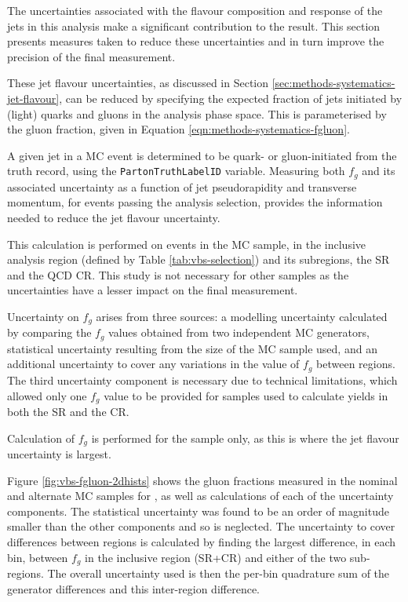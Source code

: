 \newcommand\fgluon{$f_g$\xspace}

The uncertainties associated with the flavour composition and response of the
jets in this analysis make a significant contribution to the result. This
section presents measures taken to reduce these uncertainties and in turn
improve the precision of the final measurement.

These jet flavour uncertainties, as discussed in Section
\ref{sec:methods-systematics-jet-flavour}, can be reduced by specifying the
expected fraction of jets initiated by (light) quarks and gluons in the analysis phase
space. This is parameterised by the gluon fraction, given in Equation
\ref{eqn:methods-systematics-fgluon}.

A given jet in a \ac{MC} event is determined to be quark- or gluon-initiated
from the truth record, using the \verb|PartonTruthLabelID| variable.  Measuring
both \fgluon and its associated uncertainty as a function of jet pseudorapidity
and transverse momentum, for events passing the analysis selection, provides the
information needed to reduce the jet flavour uncertainty.

This calculation is performed on events in the \QCDZy \ac{MC} sample, in
the inclusive analysis region (defined by Table \ref{tab:vbs-selection}) and its
subregions, the \ac{SR} and the \ac{QCD} \ac{CR}. This study is not necessary
for other samples as the uncertainties have a lesser impact on the final
measurement.

Uncertainty on \fgluon arises from three sources: a modelling uncertainty
calculated by comparing the \fgluon values obtained from two independent \ac{MC}
generators, statistical uncertainty resulting from the size of the \ac{MC}
sample used, and an additional uncertainty to cover any variations in the value
of \fgluon between regions. The third uncertainty component is necessary due to
technical limitations, which allowed only one \fgluon value to be provided for
samples used to calculate yields in both the \ac{SR} and the \ac{CR}.

Calculation of \fgluon is performed for the \QCDZy sample only, as this is
where the jet flavour uncertainty is largest.

Figure \ref{fig:vbs-fgluon-2dhists} shows the gluon fractions measured in the
nominal and alternate \ac{MC} samples for \QCDZy, as well as calculations
of each of the uncertainty components.  The statistical uncertainty was found to
be an order of magnitude smaller than the other components and so is neglected.
The uncertainty to cover differences between regions is calculated by finding
the largest difference, in each bin, between \fgluon in the inclusive region
(\ac{SR}+\ac{CR}) and either of the two sub-regions. The overall uncertainty
used is then the per-bin quadrature sum of the generator differences and this
inter-region difference.

